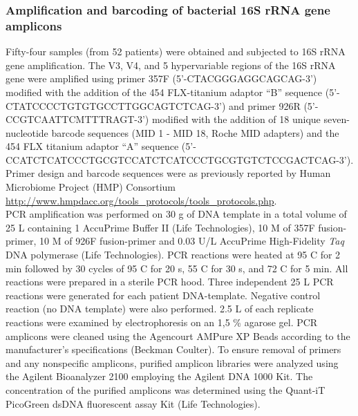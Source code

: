 \subsubsection{Amplification and barcoding of bacterial 16S rRNA gene amplicons}
Fifty-four samples (from 52 patients) were obtained and subjected to 16S rRNA gene amplification. The V3, V4, and 5 hypervariable regions of the 16S rRNA gene were amplified using primer 357F (5'-CTA\-CGG\-GAG\-GCA\-GCA\-G-3') modified with the addition of the 454 FLX-titanium adaptor ``B'' sequence (5'-CTA\-TCC\-CCT\-GTG\-TGC\-CTT\-GGC\-AGT\-CTC\-AG-3') and primer 926R (5'-CCG\-TCA\-ATT\-CMT\-TTR\-AGT-3') modified with the addition of 18 unique seven-nucleotide barcode sequences (MID 1 - MID 18, Roche MID adapters) and the 454 FLX titanium adaptor ``A'' sequence (5'-CCA\-TCT\-CAT\-CCC\-TGC\-GTC\-CAT\-CTC\-ATC\-CCT\-GCG\-TGT\-CTC\-CGA\-CTC\-AG-3').\\
Primer design and barcode sequences were as previously reported by Human Microbiome Project (HMP) Consortium \href{http://www.hmpdacc.org/tools\_protocols/tools\_protocols.php}{http://\-www\-.hmp\-dacc\-.org/\-tools\_proto\-cols/\-tools\_pro\-to\-cols\-.php}.\\
PCR amplification was performed on 30 {\textmu}g of DNA template in a total volume of 25 {\textmu}L containing 1{\texttimes} AccuPrime Buffer II (Life Technologies), 10 {\textmu}M of 357F fusion-primer, 10 {\textmu}M of 926F fusion-primer and 0.03 U/{\textmu}L AccuPrime High-Fidelity \textit{Taq} DNA polymerase (Life Technologies). PCR reactions were heated at 95 {\textdegree}C for 2 min followed by 30 cycles of 95 {\textdegree}C for 20 s, 55 {\textdegree}C for 30 s, and 72 {\textdegree}C for 5 min. All reactions were prepared in a sterile PCR hood. Three independent 25 {\textmu}L PCR reactions were generated for each patient DNA-template. Negative control reaction (no DNA template) were also performed. 2.5 {\textmu}L of each replicate reactions were examined by electrophoresis on an 1,5 \% agarose gel. PCR amplicons were cleaned using the Agencourt AMPure XP Beads according to the manufacturer's specifications (Beckman Coulter). To ensure removal of primers and any nonspecific amplicons, purified amplicon libraries were analyzed using the Agilent Bioanalyzer 2100 employing the Agilent DNA 1000 Kit. The concentration of the purified amplicons was determined using the Quant-iT PicoGreen dsDNA fluorescent assay Kit (Life Technologies).\\
